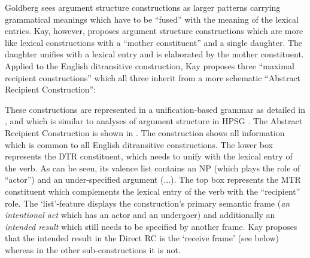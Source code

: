 Goldberg sees argument structure constructions as larger patterns carrying grammatical meanings which have to be ``fused'' with the meaning of the lexical entries. Kay, however, proposes argument structure constructions which are more like lexical constructions with a ``mother constituent'' and a single daughter. The daughter unifies with a lexical entry and is elaborated by the mother constituent. Applied to the English ditransitive construction, Kay proposes three ``maximal recipient constructions'' which all three inherit from a more schematic ``Abstract Recipient Construction'':

\ea
{}
\z

These constructions are represented in a unification-based grammar as detailed in \citet{kay99grammatical}, and which is similar to analyses of argument structure in HPSG \citep{sag94hpsg}. The Abstract Recipient Construction is shown in . The construction shows all information which is common to all English ditransitive constructions. The lower box represents the DTR constituent, which needs to unify with the lexical entry of the verb. As can be seen, its valence list contains an NP (which plays the role of ``actor'') and an under-specified argument (...). The top box represents the MTR constituent which complements the lexical entry of the verb with the ``recipient'' role. The `list'-feature displays the construction's primary semantic frame ({\em an intentional act} which has an actor and an undergoer) and additionally an {\em intended result} which still needs to be specified by another frame. Kay proposes that the intended result in the Direct RC is the `receive frame' (see below) whereas in the other sub-constructions it is not.

